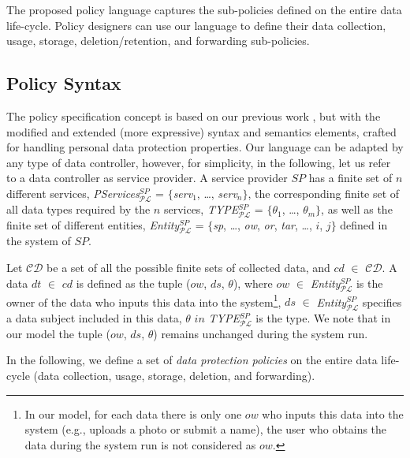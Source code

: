 \documentclass[a4paper]{article}
\begin{document}
The proposed policy language captures the sub-policies defined on the entire data life-cycle. Policy designers can use our language to define their data collection, usage, storage, deletion/retention, and forwarding sub-policies.  

        

\subsection{Policy Syntax}
\label{sec:syntaxpp}

The policy  specification concept is based on our previous work \cite{TaButin15}, but with the modified and extended (more expressive) syntax and semantics elements, crafted for handling personal data protection properties. 
Our language can be adapted by any type of data controller, however, for simplicity, in the following, let us refer to a data controller as service provider. A service provider $SP$ has a finite set of $n$ different services, \textit{PServices}$^{SP}_{\mathcal{P}\mathcal{L}}$ = $\{$\textit{serv}$_1$, \dots, \textit{serv}$_n$$\}$, the corresponding finite set of all data types required by the $n$ services, \textit{TYPE}$^{SP}_{\mathcal{P}\mathcal{L}}$ = $\{$$\theta_1$, \dots, $\theta_m$$\}$, as well as the finite set of different entities, \textit{Entity}$^{SP}_{\mathcal{P}\mathcal{L}}$ = $\{$\textit{sp}, \dots, \textit{ow}, \textit{or}, \textit{tar}, \dots, $i$, $j$$\}$ defined in the system of $SP$. 

Let $\mathcal{C}$$\mathcal{D}$ be a set of all the possible finite sets of collected data, and $cd$ $\in$ $\mathcal{C}$$\mathcal{D}$. A data $dt$ $\in$ $cd$ is defined as the tuple ($ow$, $ds$, $\theta$), where $ow$ $\in$ \textit{Entity}$^{SP}_{\mathcal{P}\mathcal{L}}$ is the owner of the data who inputs this data into the system\footnote{In our model, for each data there is only one $ow$ who inputs this data into the system (e.g.,  uploads a photo or submit a name), the user who obtains the data during the system run is not considered as $ow$.}, $ds$ $\in$ \textit{Entity}$^{SP}_{\mathcal{P}\mathcal{L}}$ specifies a data subject included in this data, $\theta$ $in$ \textit{TYPE}$^{SP}_{\mathcal{P}\mathcal{L}}$ is the type. We note that in our model the tuple ($ow$, $ds$, $\theta$) remains unchanged during the system run.  

In the following, we define a set of \textit{data protection policies} on the entire data life-cycle (data collection, usage, storage, deletion, and forwarding).    
\end{document}
